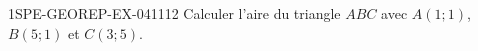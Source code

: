 \begin{exercice}{1SPE-GEOREP-EX-041}{1}{12}
Calculer l'aire du triangle $ABC$ avec $A(1 ; 1)$, $B(5 ; 1)$ et $C(3 ; 5)$.
\end{exercice}
